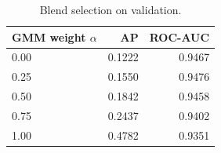 \begin{table}[H]
\centering\footnotesize\setlength{\tabcolsep}{3pt}
\caption{Blend selection on validation.}
\label{tab:blend}
\begin{tabular}{lrr}
\toprule
GMM weight $\alpha$ & AP & ROC-AUC \\
\midrule
0.00 & 0.1222 & 0.9467 \\
0.25 & 0.1550 & 0.9476 \\
0.50 & 0.1842 & 0.9458 \\
0.75 & 0.2437 & 0.9402 \\
1.00 & 0.4782 & 0.9351 \\
\bottomrule
\end{tabular}
\end{table}
